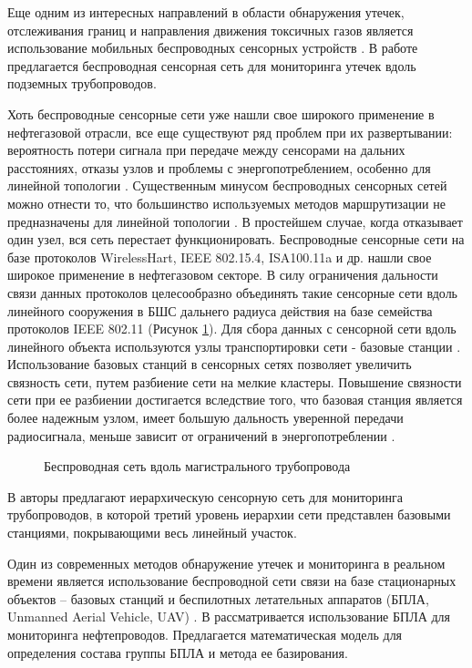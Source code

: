 Еще одним из интересных направлений в области обнаружения утечек, отслеживания границ и направления движения токсичных газов является использование мобильных беспроводных сенсорных устройств \cite{Krzyszton2021}. В работе \cite{Lin2019} предлагается беспроводная сенсорная сеть для мониторинга утечек вдоль подземных трубопроводов. 

Хоть беспроводные сенсорные сети уже нашли свое широкого применение в нефтегазовой отрасли, все еще существуют ряд проблем при их развертывании: вероятность потери сигнала при передаче между сенсорами на дальних расстояниях, отказы узлов и проблемы с энергопотреблением, особенно для линейной топологии \cite{Lee2020}. Существенным минусом беспроводных сенсорных сетей можно отнести то, что большинство используемых методов маршрутизации не предназначены для линейной топологии \cite{Abbas2018}. В простейшем случае, когда отказывает один узел, вся сеть перестает функционировать. Беспроводные сенсорные сети на базе протоколов WirelessHart, IEEE 802.15.4, ISA100.11a и др. нашли свое широкое применение в нефтегазовом секторе. В силу ограничения дальности связи данных протоколов целесообразно объединять такие сенсорные сети вдоль линейного сооружения в БШС дальнего радиуса действия на базе семейства протоколов IEEE 802.11 (Рисунок \ref{fig:part2_pipeline}). Для сбора данных с сенсорной сети вдоль линейного объекта используются узлы транспортировки сети -  базовые станции \cite{Fataliyev2018}.  Использование базовых станций в сенсорных сетях позволяет увеличить связность сети, путем разбиение сети на мелкие кластеры. Повышение связности сети при ее разбиении достигается вследствие того, что базовая станция является более надежным узлом, имеет большую дальность уверенной передачи радиосигнала, меньше зависит от ограничений в энергопотреблении \cite{Krasnov2016}.

\begin{figure}[ht]
  \caption{Беспроводная сеть вдоль магистрального трубопровода}\label{fig:part2_pipeline}
\end{figure}

В \cite{Anupama2014, Jawhar2007} авторы предлагают иерархическую сенсорную сеть для мониторинга трубопроводов, в которой третий уровень иерархии сети представлен базовыми станциями, покрывающими весь линейный участок.

Один из современных методов обнаружение утечек и мониторинга в реальном времени является использование беспроводной сети связи на базе стационарных объектов -- базовых станций и  беспилотных летательных аппаратов  (БПЛА, Unmanned Aerial Vehicle, UAV) \cite{Aljuaid2020}. В \cite{Fedorova2020} рассматривается использование БПЛА для мониторинга нефтепроводов. Предлагается математическая модель для определения состава группы БПЛА и метода ее базирования.

